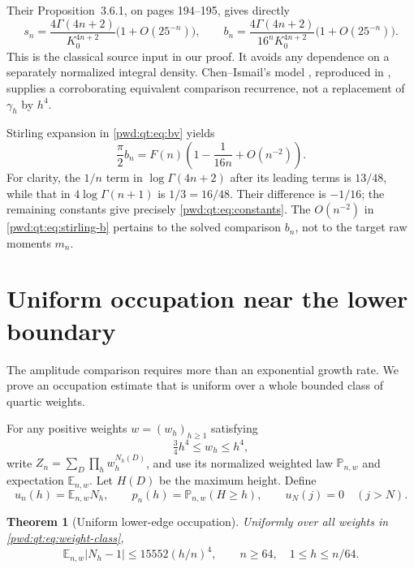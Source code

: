 \documentclass[11pt,letterpaper]{article}
\numberwithin{equation}{section}
\newtheorem{theorem}{Theorem}[section]
\theoremstyle{remark}\newtheorem{remark}[theorem]{Remark}
\newcommand{\E}{\mathbb E}\newcommand{\Prob}{\mathbb P}
\begin{document}
Their Proposition~3.6.1, on pages 194--195, gives directly
\begin{equation}\label{pwd:qt:eq:bv}
 s_n=\frac{4\Gamma(4n+2)}{K_0^{4n+2}}
        \bigl(1+O(25^{-n})\bigr),\qquad
 b_n=\frac{4\Gamma(4n+2)}{16^nK_0^{4n+2}}
        \bigl(1+O(25^{-n})\bigr).
\end{equation}
This is the classical source input in our proof. It avoids any dependence on a separately normalized integral density. Chen--Ismail's model \cite{chenismail}, reproduced in \cite{dai}, supplies a corroborating equivalent comparison recurrence, not a replacement of $\gamma_h$ by $h^4$.

Stirling expansion in \eqref{pwd:qt:eq:bv} yields
\begin{equation}\label{pwd:qt:eq:stirling-b}
 \frac\pi2b_n=F(n)\left(1-\frac1{16n}+O(n^{-2})\right).
\end{equation}
For clarity, the $1/n$ term in $\log\Gamma(4n+2)$ after its leading terms is $13/48$, while that in $4\log\Gamma(n+1)$ is $1/3=16/48$. Their difference is $-1/16$; the remaining constants give precisely \eqref{pwd:qt:eq:constants}. The $O(n^{-2})$ in \eqref{pwd:qt:eq:stirling-b} pertains to the solved comparison $b_n$, not to the target raw moments $m_n$.

\section{Uniform occupation near the lower boundary}\label{pwd:qt:sec:occupation}
The amplitude comparison requires more than an exponential growth rate. We prove an occupation estimate that is uniform over a whole bounded class of quartic weights.

For any positive weights $w=(w_h)_{h\ge1}$ satisfying
\begin{equation}\label{pwd:qt:eq:weight-class}
 \tfrac34h^4\le w_h\le h^4,
\end{equation}
write $Z_n=\sum_D\prod_hw_h^{N_h(D)}$, and use its normalized weighted law $\Prob_{n,w}$ and expectation $\E_{n,w}$. Let $H(D)$ be the maximum height. Define
\[
 u_n(h)=\E_{n,w}N_h,\qquad p_n(h)=\Prob_{n,w}(H\ge h),
 \qquad u_N(j)=0\quad(j>N).
\]

\begin{theorem}[Uniform lower-edge occupation]\label{pwd:qt:thm:occupation}
Uniformly over all weights in \eqref{pwd:qt:eq:weight-class},
\begin{equation}\label{pwd:qt:eq:occupation}
 \E_{n,w}|N_h-1|\le15552(h/n)^4,
 \qquad n\ge64,\quad 1\le h\le n/64.
\end{equation}
\end{theorem}
\end{document}

